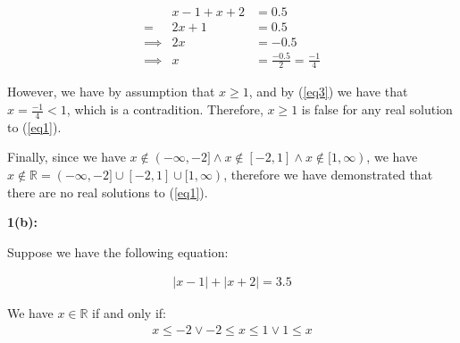 \documentclass{article}
\newcommand{\reals}{\mathbb{R}}
\begin{document}
\begin{align}
	& x-1 +x+2 & = 0.5 \\
	= & 2x+1 & = 0.5 \\
	\implies & 2x & = -0.5 \\
	\label{eq3} \implies & x & = \frac{-0.5}{2} = \frac{-1}{4}
\end{align}

However, we have by assumption that $x \geq 1$,
and by (\ref{eq3}) we have that $x = \frac{-1}{4} < 1$,
which is a contradition.
Therefore, $x \geq 1$ is false for any real solution to (\ref{eq1}).

Finally, since we have $x \not \in (-\infty,-2] \land x \not\in [-2,1] \land x \not \in [1,\infty)$,
we have $x \not \in \reals = (-\infty,-2] \cup [-2,1] \cup [1,\infty)$,
therefore we have demonstrated that there are no real solutions to (\ref{eq1}).

\medskip
\textbf{1(b):}

Suppose we have the following equation:

\begin{align} \label{eq1}
	|x-1| + |x+2| = 3.5
\end{align}

We have $x \in \reals $ if and only if:
\begin{align} \label{eq0}
	x \le -2 \lor -2 \le x \le 1 \lor 1 \le x
\end{align}
\end{document}
